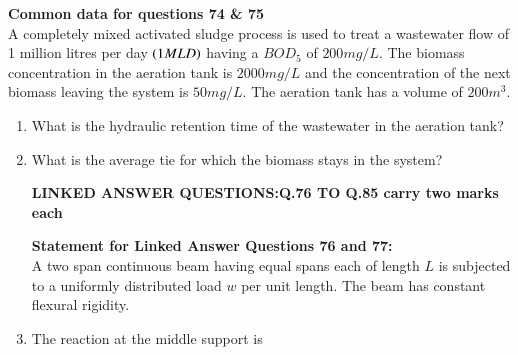 \documentclass[journal]{IEEEtran}
\begin{document}
\textbf{Common data for questions 74 \& 75} \\
A completely mixed activated sludge process is used to treat a wastewater flow of 1 million litres per day $\left(1 MLD\right)$ having a $BOD_5$ of $200 mg/L$. The biomass concentration in the aeration tank is $2000 mg/L$ and the concentration of the next biomass leaving the system is $50 mg/L$. The aeration tank has a volume of $200 m^3$.
\begin{enumerate}[start=74]
\item %
What is the hydraulic retention time of the wastewater in the aeration tank?
\begin{enumerate}
\end{enumerate}
\item %
What is the average tie for which the biomass stays in the system?
\begin{enumerate}
\end{enumerate}
\begin{center}
    \textbf{LINKED ANSWER QUESTIONS:Q.76 TO Q.85 carry two marks each}
\end{center} 
\textbf{Statement for Linked Answer Questions 76 and 77:}\\
A two span continuous beam having equal spans each of length $L$ is subjected  to a uniformly distributed load $w$ per unit length. The beam has constant flexural rigidity.
\item %
The reaction at the middle support is 
\begin{enumerate}
\end{enumerate}

\end{enumerate}
\end{document}
